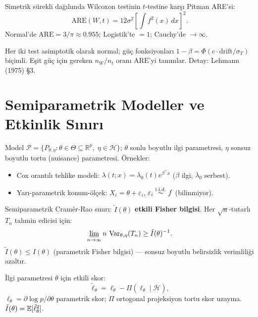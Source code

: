 \begin{teorem}\label{thm:pitman_are}
Simetrik sürekli dağılımda Wilcoxon testinin $t$-testine karşı Pitman ARE'si:
\[
  \mathrm{ARE}(W,t) = 12\sigma^2\left[\int f^2(x)\,dx\right]^2.
\]
Normal'de $\mathrm{ARE}=3/\pi\approx0.955$; Logistik'te $=1$; Cauchy'de $\to\infty$.
\end{teorem}

\begin{ispatiskele}
Her iki test asimptotik olarak normal; güç fonksiyonları $1-\beta=\Phi(c\cdot\mathrm{drift}/\sigma_T)$ biçimli. Eşit güç için gereken $n_W/n_t$ oranı $\mathrm{ARE}$'yi tanımlar. Detay: Lehmann (1975) §3.
\end{ispatiskele}

\section{Semiparametrik Modeller ve Etkinlik Sınırı}
\label{sec:semiparametrik}

\begin{tanim}\label{def:semiparametrik}
Model $\mathcal{P}=\{P_{\theta,\eta}: \theta\in\Theta\subseteq\mathbb{R}^p,\;\eta\in\mathcal{H}\}$; $\theta$ sonlu boyutlu ilgi parametresi, $\eta$ sonsuz boyutlu tortu (nuisance) parametresi. Örnekler:
\begin{itemize}
  \item Cox orantılı tehlike modeli: $\lambda(t;x)=\lambda_0(t)e^{\beta^\top x}$ ($\beta$ ilgi, $\lambda_0$ serbest).
  \item Yarı-parametrik konum-ölçek: $X_i=\theta+\varepsilon_i$, $\varepsilon_i\overset{\text{i.i.d.}}{\sim} f$ (bilinmiyor).
\end{itemize}
\end{tanim}

\begin{tanim}\label{def:etkin_bilgi}
Semiparametrik Cramér-Rao sınırı: $\tilde{I}(\theta)$ \textbf{etkili Fisher bilgisi}. Her $\sqrt{n}$-tutarlı $T_n$ tahmin edicisi için:
\[
  \varliminf_{n\to\infty} n\,\operatorname{Var}_{\theta,\eta}(T_n) \geq \tilde{I}(\theta)^{-1}.
\]
$\tilde{I}(\theta) \leq I(\theta)$ (parametrik Fisher bilgisi) --- sonsuz boyutlu belirsizlik verimliliği azaltır.
\end{tanim}

\begin{teorem}\label{thm:etkin_skor}
İlgi parametresi $\theta$ için etkili skor:
\[
  \tilde\ell_\theta = \ell_\theta - \Pi(\ell_\theta \mid \overline{\mathcal{H}}),
\]
$\ell_\theta = \partial\log p/\partial\theta$ parametrik skor; $\Pi$ ortogonal projeksiyon tortu skor uzayına. $\tilde{I}(\theta)=\mathbb{E}[\tilde\ell_\theta^2]$.
\end{teorem}

